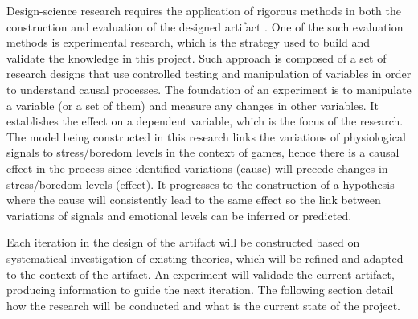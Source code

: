 
Design-science research requires the application of rigorous methods in both the construction and evaluation of the designed artifact \parencite{hevner2004design}. One of the such evaluation methods is experimental research, which is the strategy used to build and validate the knowledge in this project. Such approach is composed of a set of research designs that use controlled testing and manipulation of variables in order to understand causal processes. The foundation of an experiment is to manipulate a variable (or a set of them) and measure any changes in other variables. It establishes the effect on a dependent variable, which is the focus of the research. The model being constructed in this research links the variations of physiological signals to stress/boredom levels in the context of games, hence there is a causal effect in the process since identified variations (cause) will precede changes in stress/boredom levels (effect). It progresses to the construction of a hypothesis where the cause will consistently lead to the same effect so the link between variations of signals and emotional levels can be inferred or predicted.

Each iteration in the design of the artifact will be constructed based on systematical investigation of existing theories, which will be refined and adapted to the context of the artifact. An experiment will validade the current artifact, producing information to guide the next iteration. The following section detail how the research will be conducted and what is the current state of the project.

